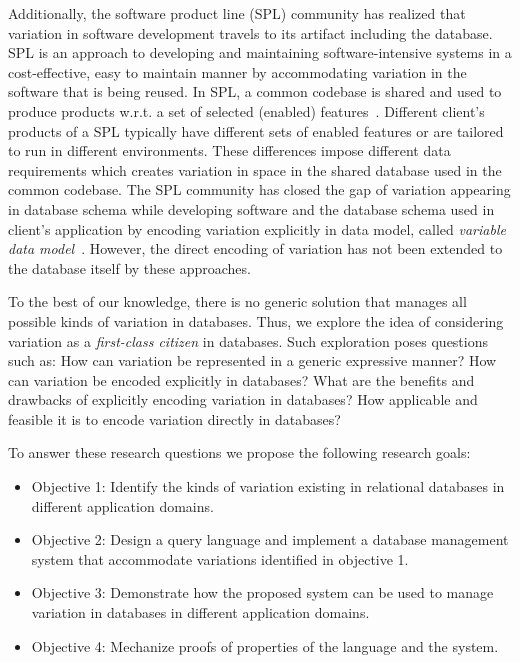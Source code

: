 Additionally, the software product line (SPL) community has realized that 
variation in software development travels to its artifact including the database.
%
SPL is an
approach to developing and maintaining software-intensive systems 
in a cost-effective, easy to maintain manner by accommodating variation
in the software that is being reused. 
%
In SPL, a common codebase is shared and used to produce products w.r.t.
a set of selected (enabled) features~\cite{splBook}. 
%
Different client's products of a SPL typically have different
sets of enabled features or are tailored to run in different environments. These
differences impose different data requirements which creates variation in space 
in the shared database used in the common codebase. 
%
The SPL community has closed
the gap of variation appearing in database schema while developing software
and the database schema used in client's application by
encoding variation explicitly in data model, called \emph{variable data model}~\cite{}. 
However, the direct encoding of variation has not been extended to the
database itself by these approaches. 

To the best of our knowledge, 
there is no generic solution that manages all possible kinds of
variation in databases. Thus, we explore the idea of considering
variation as a \emph{first-class citizen} in databases. Such exploration
poses questions such as: How can variation be represented in a generic
expressive manner? How can variation be encoded explicitly in databases?
What are the benefits and drawbacks of explicitly encoding variation in 
databases? How applicable and feasible it is to encode variation 
directly in databases?

To answer these research questions we propose the following research goals:

\begin{itemize}
\item Objective 1: Identify the kinds of variation existing in relational databases in 
different application domains.
\item Objective 2: Design a query language and implement a database management 
system that accommodate  variations identified in objective 1.
\item Objective 3: Demonstrate how the proposed system can be used to manage
variation in databases in different application domains.
\item Objective 4: Mechanize proofs of properties of the language and the system.
\end{itemize}


